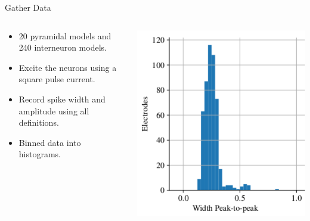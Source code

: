 \documentclass[aspectratio=169]{beamer}
\begin{document}
\begin{frame}{Gather Data}
    \begin{columns}
        \begin{column}{0.68\textwidth}
            \begin{itemize}
                \item 20 pyramidal models and 240 interneuron models.
                \item Excite the neurons using a square pulse current. 
                \item Record spike width and amplitude using all definitions. 
                \item Binned data into histograms. 
            \end{itemize}
        \end{column}
        \begin{column}{0.28\textwidth}
            \begin{center}
                \includegraphics[width=\textwidth]{images/sphere_spike_width_II_hist_mod.pdf}
            \end{center}
        \end{column}
    \end{columns}
\end{frame}
\end{document}
